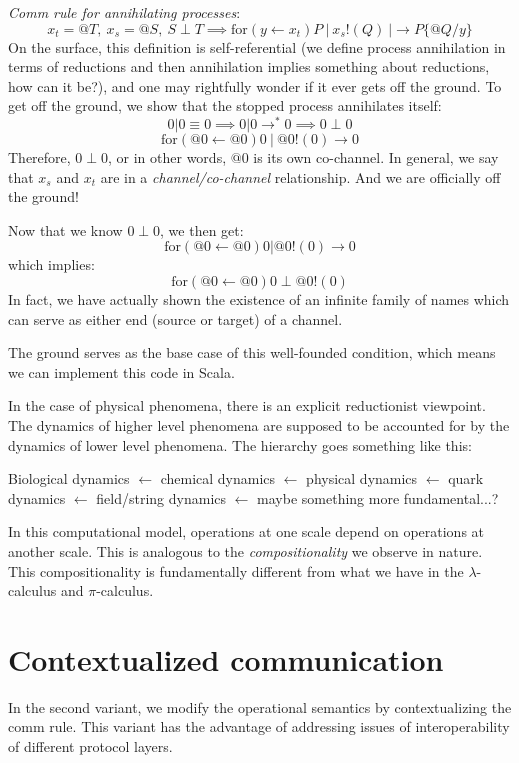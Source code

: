 \documentclass[12pt]{article}
\numberwithin{equation}{section}
\begin{document}
\emph{Comm rule for annihilating processes}:
\[ x_t=@T, \ x_s=@S, \ S \perp T \implies \text{for}( y \leftarrow x_t)P \ | \ x_s !(Q) \ | \rightarrow P \{ @Q/y \} \]
On the surface, this definition is self-referential (we define process annihilation in terms of reductions and then annihilation implies something about reductions, how can it be?), and one may rightfully wonder if it ever gets off the ground. To get off the ground, we show that the stopped process annihilates itself:
\[ 0 | 0 \equiv 0 \implies 0|0 \rightarrow^* 0 \implies 0 \perp 0 \]
\[ \text{for}(@0 \leftarrow @0)0 \ | \ @0 !(0) \rightarrow 0 \]
Therefore, $0 \perp 0$, or in other words, $@0$ is its own co-channel. In general, we say that $x_s$ and $x_t$ are in a \emph{channel/co-channel} relationship. And we are officially off the ground!

Now that we know $ 0 \perp 0 $, we then get:
\[ \text{for}( @0 \leftarrow @0 )0 | @0!(0) \rightarrow 0 \]
which implies:
\[ \text{for}( @0 \leftarrow @0 )0 \perp @0!(0) \]
In fact, we have actually shown the existence of an infinite family of names which can serve as either end (source or target) of a channel.

The ground serves as the base case of this well-founded condition, which means we can implement this code in Scala.

In the case of physical phenomena, there is an explicit reductionist viewpoint. The dynamics of higher level phenomena are supposed to be accounted for by the dynamics of lower level phenomena. The hierarchy goes something like this:
\begin{center}
Biological dynamics $\leftarrow$ chemical dynamics $\leftarrow$ physical dynamics $\leftarrow$ quark dynamics $\leftarrow$ field/string dynamics $\leftarrow$ maybe something more fundamental...? \end{center}

In this computational model, operations at one scale depend on operations at another scale. This is analogous to the \emph{compositionality} we observe in nature. This compositionality is fundamentally different from what we have in the $\lambda$-calculus and $\pi$-calculus. 


\section{Contextualized communication}
In the second variant, we modify the operational semantics by contextualizing the comm rule. This variant has the advantage of addressing issues of interoperability of different protocol layers.
\end{document}
